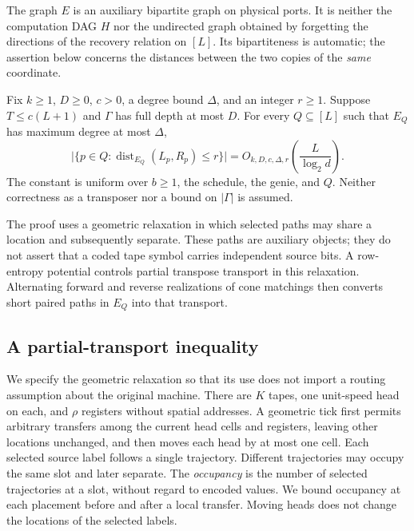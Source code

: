 The graph $E$ is an auxiliary bipartite graph on physical ports.  It is
neither the computation DAG $H$ nor the undirected graph obtained by
forgetting the directions of the recovery relation on $[L]$.  Its
bipartiteness is automatic; the assertion below concerns the distances
between the two copies of the \emph{same} coordinate.

\begin{theorem}\label{thm:nb-main}
Fix $k\ge1$, $D\ge0$, $c>0$, a degree bound $\Delta$, and an integer
$r\ge1$.  Suppose $T\le c(L+1)$ and $\Gamma$ has full depth at most
$D$.  For every $Q\subseteq[L]$ such that $E_Q$ has maximum degree at
most $\Delta$,
\begin{equation}\label{eq:nb-main-bound}
 \bigl|\{p\in Q:\operatorname{dist}_{E_Q}(L_p,R_p)\le r\}\bigr|
   =O_{k,D,c,\Delta,r}\!\left(\frac{L}{\log_2d}\right).
\end{equation}
The constant is uniform over $b\ge1$, the schedule, the genie, and $Q$.
Neither correctness as a transposer nor a bound on $|\Gamma|$ is assumed.
\end{theorem}

The proof uses a geometric relaxation in which selected paths may share
a location and subsequently separate.  These paths are auxiliary objects;
they do not assert that a coded tape symbol carries independent source
bits.  A row-entropy potential controls partial transpose transport in
this relaxation.  Alternating forward and reverse realizations of cone
matchings then converts short paired paths in $E_Q$ into that transport.

\subsection{A partial-transport inequality}

We specify the geometric relaxation so that its use does not import a
routing assumption about the original machine.  There are $K$ tapes,
one unit-speed head on each, and $\rho$ registers without spatial
addresses.  A geometric tick first permits arbitrary transfers among
the current head cells and registers, leaving other locations unchanged,
and then moves each head by at most one cell.  Each selected source
label follows a single trajectory.  Different trajectories may occupy
the same slot and later separate.  The \emph{occupancy} is the number
of selected trajectories at a slot, without regard to encoded values.
We bound occupancy at each placement before and after a local transfer.
Moving heads does not change the locations of the selected labels.

